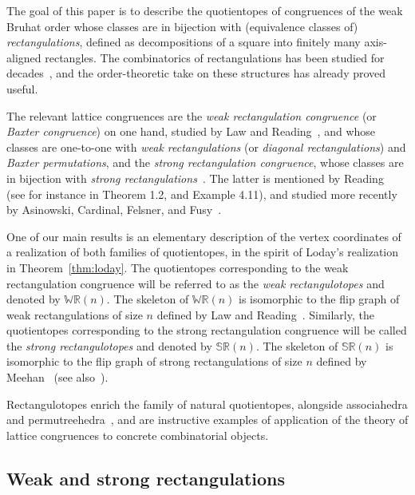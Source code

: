 \documentclass{amsart}
\theoremstyle{definition}
\newcommand{\darkblue}{\color{darkblue}} %
\newcommand{\defn}[1]{\textsl{\darkblue #1}} %
\newcommand{\polytope}[1]{\mathds{#1}} %
\newcommand{\WRP}{\polytope{WR}} %
\newcommand{\SRP}{\polytope{SR}} %
\begin{document}
The goal of this paper is to describe the quotientopes of congruences of the weak Bruhat order whose classes are in bijection with (equivalence classes of) \defn{rectangulations}, defined as decompositions of a square into finitely many axis-aligned rectangles.
The combinatorics of rectangulations has been studied for decades~\cite{MR2233287,MR2871762,MR2864445,MR2763051,MR3084577,MR3878132,MR4598046}, and the order-theoretic take on these structures has already proved useful.

The relevant lattice congruences are the \defn{weak rectangulation congruence} (or \defn{Baxter congruence}) on one hand, studied by Law and Reading~\cite{MR2871762}, and whose classes are one-to-one with \defn{weak rectangulations} (or \defn{diagonal rectangulations}) and \defn{Baxter permutations}, and the \defn{strong rectangulation congruence}, whose classes are in bijection with \defn{strong rectangulations}~\cite{MR2864445}.
The latter is mentioned by Reading~\cite{MR3335492} (see for instance in Theorem 1.2, and Example 4.11), and studied more recently by Asinowski, Cardinal, Felsner, and Fusy~\cite{ACFF24}.

One of our main results is an elementary description of the vertex coordinates of a realization of both families of quotientopes, in the spirit of Loday's realization in Theorem~\ref{thm:loday}.
The quotientopes corresponding to the weak rectangulation congruence will be referred to as the \defn{weak rectangulotopes} and denoted by $\WRP(n)$.
The skeleton of $\WRP(n)$ is isomorphic to the flip graph of weak rectangulations of size $n$ defined by Law and Reading~\cite{MR2871762}.
Similarly, the quotientopes corresponding to the strong rectangulation congruence will be called the \defn{strong rectangulotopes} and denoted by $\SRP(n)$.
The skeleton of $\SRP(n)$ is isomorphic to the flip graph of strong rectangulations of size $n$ defined by Meehan~\cite{MR3697823} (see also~\cite{ACFF24}).

Rectangulotopes enrich the family of natural quotientopes, alongside associahedra and permutreehedra~\cite{MR3856522}, and are instructive examples of application of the theory of lattice congruences to concrete combinatorial objects.


\subsection{Weak and strong rectangulations}
\end{document}
